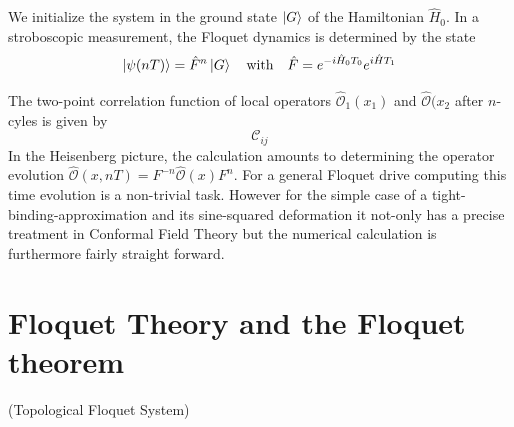\documentclass[11pt, a4paper]{article}
\theoremstyle{definition} %
\begin{document}
	We initialize the system in the ground state $\ket{G}$ of the Hamiltonian $\hat{H}_0$. In a stroboscopic measurement, the Floquet dynamics is determined by the state 
	\begin{equation}
		\ket{\psi(nT)} = \hat{F}^n \ket{G} \qq{with} \hat{F} = e^{-i \hat{H}_0 T_0} e^{i \hat{H} T_1}
	\end{equation}
	
	The two-point correlation function of local operators $\hat{\mathcal{O}}_1(x_1)$ and $\hat{\mathcal{O}}(x_2$ after $n$-cyles is given by
	\begin{equation}
		\mathcal{C}_{ij}
	\end{equation}
	In the Heisenberg picture, the calculation amounts to determining the operator evolution $\hat{\mathcal{O}}(x, nT) = F^{-n} \hat{\mathcal{O}}(x) F^{n}$. For a general Floquet drive computing this time evolution is a non-trivial task. However for the simple case of a tight-binding-approximation and its sine-squared deformation it not-only has a precise treatment in Conformal Field Theory but the numerical calculation is furthermore fairly straight forward.
	
	\section{Floquet Theory and the Floquet theorem}
	(Topological Floquet System)
\end{document}
